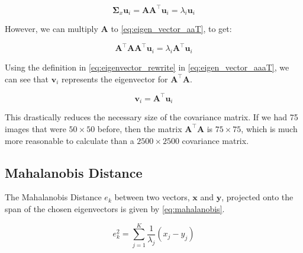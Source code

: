 \documentclass[headings=optiontoheadandtoc,listof=totoc,parskip=full]{scrartcl}
\begin{document}
\begin{equation}\label{eq:eigen_vector_aaT}
    \mathbf{\Sigma}_x\mathbf{u}_i = \mathbf{AA}^\top \mathbf{u}_i = \lambda_i\mathbf{u}_i
\end{equation}

However, we can multiply $\mathbf{A}$ to \cref{eq:eigen_vector_aaT}, to get:

\begin{equation}\label{eq:eigen_vector_aaaT}
\mathbf{A^\top AA^\top} \mathbf{u}_i = \lambda_i \mathbf{A}^\top \mathbf{u}_i
\end{equation}

Using the definition in \cref{eq:eigenvector_rewrite} in \cref{eq:eigen_vector_aaaT}, we can see that $\mathbf{v}_i$ represents the eigenvector for $\mathbf{A^\top A}$. 

\begin{equation}\label{eq:eigenvector_rewrite}
    \mathbf{v}_i = \mathbf{A}^\top \mathbf{u}_i
\end{equation}






This drastically reduces the necessary size of the covariance matrix. If we had 75 images that were $50 \times 50$ before, then the matrix $\mathbf{A^\top A}$ is $75 \times 75$, which is much more reasonable to calculate than a $2500 \times 2500$ covariance matrix.

\subsection{Mahalanobis Distance}
\label{sec:theory-mahalanobis}

The Mahalanobis Distance $e_k$ between two vectors, $\mathbf{x}$ and $\mathbf{y}$, projected onto the span of the chosen eigenvectors is given by \cref{eq:mahalanobis}.

\begin{equation}
    e_k^2 = \sum_{j=1}^K \frac{1}{\lambda_j} (x_j - y_j) \label{eq:mahalanobis}
\end{equation}
\end{document}
